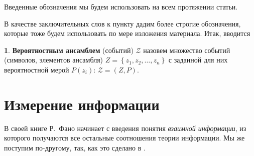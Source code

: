 \documentclass[12pt,a4paper,openright]{book}
\theoremstyle{definition}
\newtheorem{definition}{\textls[150]{Определение}}[chapter]
\numberwithin{equation}{chapter}
\begin{document}
	Введенные обозначения мы будем использовать на всем протяжении статьи.

	В качестве заключительных слов к пункту дадим более строгие обозначения, которые тоже будем использовать по мере изложения материала. Итак, вводится
	\begin{definition}
		\textbf{Вероятностным ансамблем} (событий) $\mathcal{Z}$ назовем множество событий (символов, элементов ансамбля) $Z = \left\{z_1, z_2, \dots, z_n \right\}$ с заданной для них вероятностной мерой $P(z_i)$: $\mathcal{Z} = (Z, P)$.
	\end{definition}









	\section{Измерение информации}

	В своей книге \cite{bib:fano} Р.~Фано начинает с введения понятия \textit{взаимной информации}, из которого получаются все остальные соотношения теории информации. Мы же поступим по-другому, так, как это сделано в \cite[гл.3 стр.124]{bib:panin}.
\end{document}
